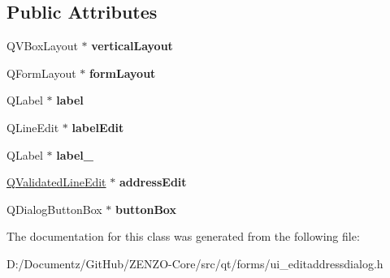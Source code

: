\subsection*{Public Attributes}
\begin{DoxyCompactItemize}
\item 
\mbox{\label{class_ui___edit_address_dialog_a5befaa4ab1f474df6d323b7d6a47eb6b}} 
Q\+V\+Box\+Layout $\ast$ {\bfseries vertical\+Layout}
\item 
\mbox{\label{class_ui___edit_address_dialog_af1d365e8a31f53c121969f3d6f2ac0fc}} 
Q\+Form\+Layout $\ast$ {\bfseries form\+Layout}
\item 
\mbox{\label{class_ui___edit_address_dialog_a834b26d8b1eb612de76fdc8f4a9af779}} 
Q\+Label $\ast$ {\bfseries label}
\item 
\mbox{\label{class_ui___edit_address_dialog_a965f1837754898979345aaa1428b656b}} 
Q\+Line\+Edit $\ast$ {\bfseries label\+Edit}
\item 
\mbox{\label{class_ui___edit_address_dialog_ae8d2624c6637b2863d6cc7a08ed12b29}} 
Q\+Label $\ast$ {\bfseries label\+\_}
\item 
\mbox{\label{class_ui___edit_address_dialog_a16ddb1770145641db36f735c5290c67f}} 
\mbox{\hyperlink{class_q_validated_line_edit}{Q\+Validated\+Line\+Edit}} $\ast$ {\bfseries address\+Edit}
\item 
\mbox{\label{class_ui___edit_address_dialog_adc20f7ecc7b5616fb19c4f6cc13af84f}} 
Q\+Dialog\+Button\+Box $\ast$ {\bfseries button\+Box}
\end{DoxyCompactItemize}


The documentation for this class was generated from the following file\+:\begin{DoxyCompactItemize}
\item 
D\+:/\+Documentz/\+Git\+Hub/\+Z\+E\+N\+Z\+O-\/\+Core/src/qt/forms/ui\+\_\+editaddressdialog.\+h\end{DoxyCompactItemize}
